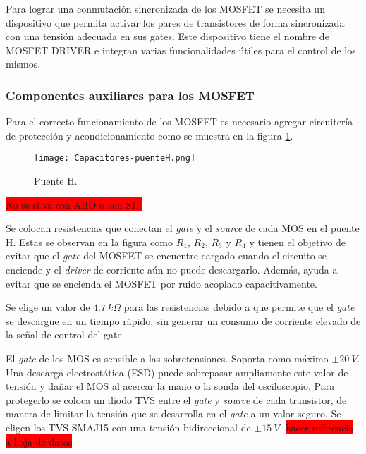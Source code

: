 Para lograr una conmutación sincronizada de los MOSFET se necesita un dispositivo que permita activar los pares de transistores de forma sincronizada con una tensión adecuada en sus gates. Este dispositivo tiene el nombre de MOSFET DRIVER e integran varias funcionalidades útiles para el control de los mismos. 

\subsubsection{Componentes auxiliares para los MOSFET} \label{sec_auxiliares_mosfet}


Para el correcto funcionamiento de los MOSFET es necesario agregar circuitería de protección y acondicionamiento como se muestra en la figura \ref{fig:img_capacitores-puenteH}.


\begin{figure}[H]
	\centering
	\texttt{[image: Capacitores-puenteH.png]}
	\caption{Puente H.}
	\label{fig:img_capacitores-puenteH}
\end{figure}

\colorbox{red}{No se si va con AHO o con S1..}

\label{sec_res-gate}

\noindent Se colocan resistencias que conectan el \textsl{gate} y el \textsl{source} de cada MOS en el puente H. Estas se observan en la figura como $R_1$, $R_2$, $R_3$ y $R_4$ y tienen el objetivo de evitar que el \textsl{gate} del MOSFET se encuentre cargado cuando el circuito se enciende y el \textsl{driver} de corriente aún no puede descargarlo. Además, ayuda a evitar que se encienda el MOSFET por ruido acoplado capacitivamente. 

\noindent Se elige un valor de $4.7 \:k\Omega$  para las resistencias debido a que permite que el \textsl{gate} se descargue en un tiempo rápido, sin generar un consumo de corriente elevado de la señal de control del gate.


\noindent El \textsl{gate} de los MOS es sensible a las sobretensiones. Soporta como máximo $\pm 20\:V$. Una descarga electrostática (ESD) puede sobrepasar ampliamente este valor de tensión y dañar el MOS al acercar la mano o la sonda del osciloscopio. Para protegerlo se coloca un diodo TVS entre el \textsl{gate} y \textsl{source} de cada transistor, de manera de limitar la tensión que se desarrolla en el \textsl{gate} a un valor seguro. Se eligen los TVS SMAJ15 con una tensión bidireccional de $\pm 15\:V$.
\colorbox{red}{hacer referencia a hoja de datos}

